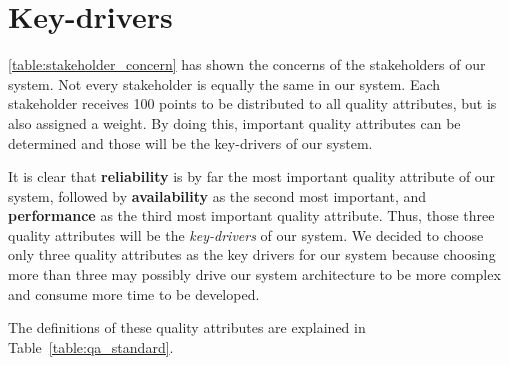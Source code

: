 \section{Key-drivers}

\autoref{table:stakeholder_concern} has shown the concerns of the stakeholders of our system. Not every stakeholder is equally the same in our system. Each stakeholder receives 100 points to be distributed to all quality attributes, but is also assigned a weight. By doing this, important quality attributes can be determined and those will be the key-drivers of our system.

It is clear that \textbf{reliability} is by far the most important quality attribute of our system, followed by \textbf{availability} as the second most important, and \textbf{performance} as the third most important quality attribute. Thus, those three quality attributes will be the \textit{key-drivers} of our system. We decided to choose only three quality attributes as the key drivers for our system because choosing more than three may possibly drive our system architecture to be more complex and consume more time to be developed.

The definitions of these quality attributes are explained in Table~\ref{table:qa_standard}.
